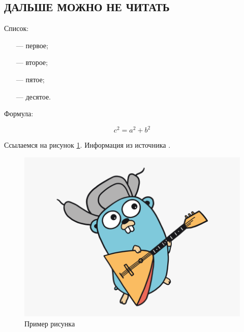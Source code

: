 \subsection{ДАЛЬШЕ МОЖНО НЕ ЧИТАТЬ}

Список:

\begin{itemize}[leftmargin=1.6\parindent]
	\item[---] первое;
	\item[---] второе;
	\item[---] пятое;
	\item[---] десятое.
\end{itemize}

Формула:

\begin{equation}
c^2 = a^2 + b^2
\end{equation}

Ссылаемся на рисунок \ref{fig:a1}. Информация из источника \cite{golang}.

\begin{figure}[hbtp]
	\centering
	\includegraphics[width=\textwidth]{img/golang.png}
	\caption{Пример рисунка}
	\label{fig:a1}
\end{figure}


\pagebreak